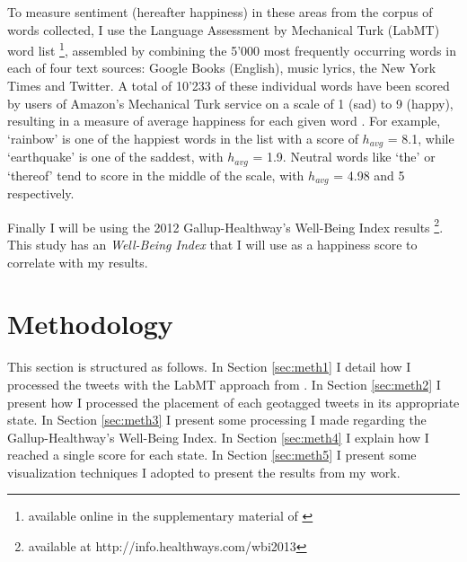 \documentclass{llncs}
\begin{document}
To measure sentiment (hereafter happiness) in these areas from the corpus of words collected, I use the Language Assessment by Mechanical Turk (LabMT) word list \footnote{available online in the supplementary material of \cite{Dodds2011}}, assembled by combining the 5'000 most frequently occurring words in each of four text sources: Google Books (English), music lyrics, the New York Times and Twitter. A total of  10'233 of these individual words have been scored by users of Amazon’s Mechanical Turk service on a scale of 1 (sad) to 9 (happy), resulting in a measure of average happiness for each given word \cite{Kloumann2012}. For example, `rainbow' is one of the happiest words in the list with a score of $h_{avg}$ = 8.1, while `earthquake' is one of the saddest, with $h_{avg}$ = 1.9. Neutral words like `the' or `thereof' tend to score in the middle of the scale, with $h_{avg}$ = 4.98 and 5 respectively.

Finally I will be using the 2012 Gallup-Healthway's Well-Being Index results \cite{GallupHealthway2013} \footnote{available at http://info.healthways.com/wbi2013}. This study has an \emph{Well-Being Index} that I will use as a happiness score to correlate with my results.

\FloatBarrier
\section{Methodology}
\label{sec:meth}
This section is structured as follows. In Section \ref{sec:meth1} I detail how I processed the tweets with the LabMT approach from \cite{Dodds2011}. In Section \ref{sec:meth2} I present how I processed the placement of each geotagged tweets in its appropriate state. In Section \ref{sec:meth3} I present some processing I made regarding the Gallup-Healthway's Well-Being Index. In Section \ref{sec:meth4} I explain how I reached a single score for each state. In Section \ref{sec:meth5} I present some visualization techniques I adopted to present the results from my work.
\end{document}
